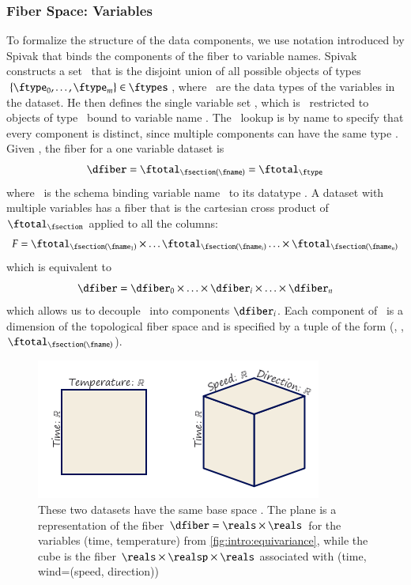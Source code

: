 \documentclass[journal]{vgtc}                %
\begin{document}
\subsubsection{Fiber Space: Variables}
\label{sec:math:data:fiber}
To formalize the structure of the data components, we use notation introduced by Spivak \cite{spivakSIMPLICIALDATABASES,spivakDatabasesAreCategories2010} that binds the components of the fiber to variable names. Spivak constructs a set \ftotal\ that is the disjoint union of all possible objects of types $\{\ftype_0, \ldots, \ftype_m\} \in \ftypes$, where \ftypes\ are the data types of the variables in the dataset. He then defines the single variable set \fttype, which is \ftotal\ restricted to objects of type \ftype\ bound to variable name \fname. The \fttype\ lookup is by name to specify that every component is distinct, since multiple components can have the same type \ftype. Given \fsection, the fiber for a one variable dataset is
\begin{equation}
    \dfiber = \ftotal_{\fsection(\fname)} = \ftotal_{\ftype} 
\end{equation}
where \fsection\ is the schema binding variable name \fname\ to its datatype \ftype. A dataset with multiple variables has a fiber that is the cartesian cross product of $\ftotal_{\fsection}$ applied to all the columns:
\begin{equation}
F = \ftotal_{\fsection(\fname_{1})}\times \ldots \ftotal_{\fsection(\fname_{i})} \ldots\times \ftotal_{\fsection(\fname_{n})}
\end{equation}
which is equivalent to 
\begin{equation}
    \label{eq:math:data:fiber:decompose}
    \dfiber= \dfiber_{0} \times \ldots \times \dfiber_{i}\times\ldots\times \dfiber_{n}
\end{equation}
which allows us to decouple \dfiber\ into components $\dfiber_i$. Each component of \dfiber\ is a dimension of the topological fiber space and is specified by a tuple of the form (\fname, \ftype, \(\ftotal_{\fsection(\fname)}\)). 
\begin{figure}[htb]
  \centering 
  \includegraphics[width=\columnwidth]{fiber.png}
  \caption{These two datasets have the same base space \dbase. The plane is a representation of the fiber $\dfiber=\reals\times\reals$ for the variables (time, temperature) from \autoref{fig:intro:equivariance}, while the cube is the fiber $\reals\times\realsp\times\reals$ associated with (time, wind=(speed, direction))}
  \label{fig:math:data:fiber}
\end{figure}
\end{document}
